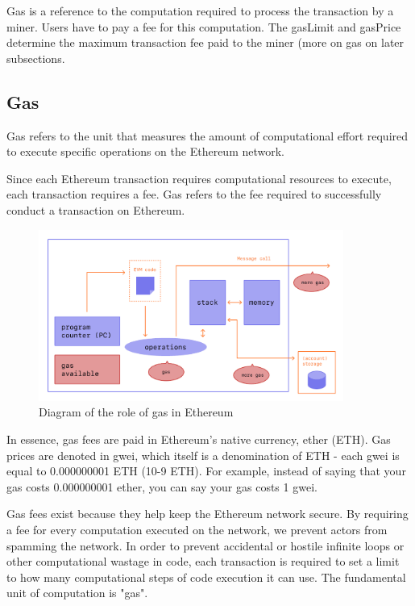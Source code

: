 Gas is a reference to the computation required to process the transaction by a miner. Users have to pay a fee for this computation. The gasLimit and gasPrice determine the maximum transaction fee paid to the miner (more on gas on later subsections\cite{ethereumcommunityEthereumDevelopmentDocumentation}.

\subsection{Gas}
Gas refers to the unit that measures the amount of computational effort required to execute specific operations on the Ethereum network.

Since each Ethereum transaction requires computational resources to execute, each transaction requires a fee. Gas refers to the fee required to successfully conduct a transaction on Ethereum.

\begin{figure}[h]
	\centering
		\includegraphics[width=10cm]{images/chapter2/gas.png}
		\caption{{\footnotesize Diagram of the role of gas in Ethereum \cite{taniTakenobuhsEthereumevmillustratedOnline2021}}}
\end{figure}

In essence, gas fees are paid in Ethereum's native currency, ether (ETH). Gas prices are denoted in gwei, which itself is a denomination of ETH - each gwei is equal to 0.000000001 ETH (10-9 ETH). For example, instead of saying that your gas costs 0.000000001 ether, you can say your gas costs 1 gwei.

Gas fees exist because they help keep the Ethereum network secure. By requiring a fee for every computation executed on the network, we prevent actors from spamming the network. In order to prevent accidental or hostile infinite loops or other computational wastage in code, each transaction is required to set a limit to how many computational steps of code execution it can use. The fundamental unit of computation is "gas"\cite{ethereumcommunityEthereumDevelopmentDocumentation}.

